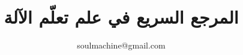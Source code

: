 \documentclass[graybox, envcountchap]{styles/svmult}
\author{soulmachine@gmail.com}
\title{المرجع السريع في علم تعلّم الآلة}
\begin{document}
\frontmatter


%
%
%
%

\RLmulticolcolumns
\begin{multicols}{2}

\tableofcontents
\end{multicols}

\begin{english}


%

\end{english}


\RLmulticolcolumns


\begin{multicols}{2}
%

\mainmatter%
%
%
%
%
%
%
%
%
%
%
%
%
%
%
%
%
%
%
%
%
%
%
%
%
%
%
%
%
%
%

\backmatter%
\appendix
%
%
\printindex

\end{multicols}
\end{document}
